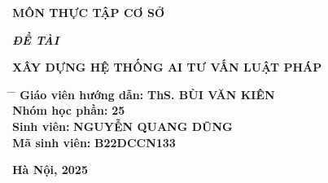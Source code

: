 \documentclass[a4paper]{article}
\begin{document}
\begin{titlepage}
\begin{center}
			\vspace{7pt}
			\textbf{MÔN THỰC TẬP CƠ SỞ}
		\end{center}
		
		\vspace{10pt}
		\begin{flushleft}
			\fontsize{14pt}{17pt}\selectfont  
			\textbf{\textsl{ĐỀ TÀI}}
		\end{flushleft}
		\begin{center}
			\fontsize{18pt}{17pt}\selectfont 
			\textbf{\textrm{XÂY DỰNG HỆ THỐNG AI TƯ VẤN LUẬT PHÁP}}
		\end{center}
		
		\vspace{6pt}

		\begin{adjustwidth}{2cm}{0cm}
    \begin{tabbing}
        \fontsize{16pt}{20pt}\selectfont
        \hspace{6cm} \= \hspace{5cm} \= \kill
        \textbf{Giáo viên hướng dẫn:} \> \textbf{ThS. BÙI VĂN KIÊN} \>\\ [6pt]
        \textbf{Nhóm học phần:} \> \textbf{25} \>\\ [6pt]
        \textbf{Sinh viên:} \> \textbf{NGUYỄN QUANG DŨNG} \>\\ [6pt]
        \textbf{Mã sinh viên:} \> \textbf{B22DCCN133} \>\\ [6pt]
    \end{tabbing}
\end{adjustwidth}

		
		
		\vspace{14pt}
		\begin{center}
			\textbf{Hà Nội, 2025}
		\end{center}
	\end{titlepage}
	

\clearpage



\clearpage

\tableofcontents

\clearpage


\renewcommand{\listfigurename}{Danh mục hình ảnh}
\listoffigures
{}



\renewcommand{\listtablename}{Danh mục bảng biểu}
\listoftables
{}
\end{document}
